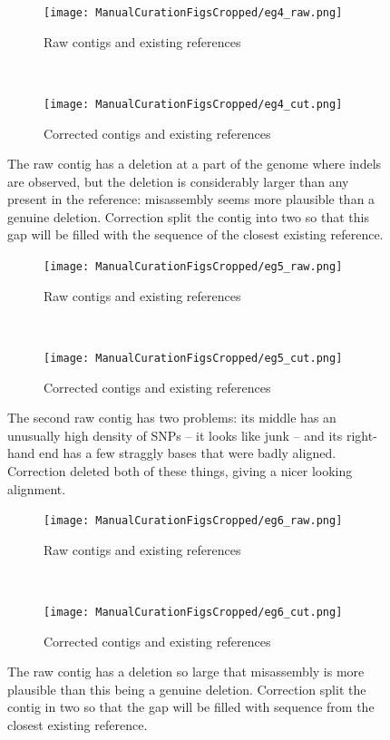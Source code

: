 \documentclass{article}
\begin{document}
\begin{landscape}
\begin{figure}[!h]
\centering
\begin{subfigure}{1.3\textwidth}

\texttt{[image: ManualCurationFigsCropped/eg4\_raw.png]}
\caption{Raw contigs and existing references}
\end{subfigure}
\vspace*{1cm} \\
\begin{subfigure}{1.3\textwidth}

\texttt{[image: ManualCurationFigsCropped/eg4\_cut.png]}
\caption{Corrected contigs and existing references}
\end{subfigure}
\caption{The raw contig has a deletion at a part of the genome where indels are observed, but the deletion is considerably larger than any present in the reference: misassembly seems more plausible than a genuine deletion.
Correction split the contig into two so that this gap will be filled with the sequence of the closest existing reference.}
\end{figure}

\begin{figure}[!h]
\centering
\begin{subfigure}{1.3\textwidth}
\texttt{[image: ManualCurationFigsCropped/eg5\_raw.png]}
\caption{Raw contigs and existing references}
\end{subfigure}
\vspace*{1cm} \\
\begin{subfigure}{1.3\textwidth}
\texttt{[image: ManualCurationFigsCropped/eg5\_cut.png]}
\caption{Corrected contigs and existing references}
\end{subfigure}
\caption{The second raw contig has two problems: its middle has an unusually high density of SNPs -- it looks like junk -- and its right-hand end has a few straggly bases that were badly aligned.
Correction deleted both of these things, giving a nicer looking alignment.}
\end{figure}

\begin{figure}[!h]
\centering
\begin{subfigure}{1.3\textwidth}
\texttt{[image: ManualCurationFigsCropped/eg6\_raw.png]}
\caption{Raw contigs and existing references}
\end{subfigure}
\vspace*{1cm} \\
\begin{subfigure}{1.3\textwidth}
\texttt{[image: ManualCurationFigsCropped/eg6\_cut.png]}
\caption{Corrected contigs and existing references}
\end{subfigure}
\caption{The raw contig has a deletion so large that misassembly is more plausible than this being a genuine deletion.
Correction split the contig in two so that the gap will be filled with sequence from the closest existing reference.}
\end{figure}


\end{landscape}
\end{document}

